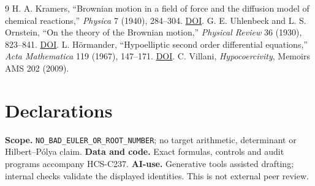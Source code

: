 \documentclass[10pt]{article}
\begin{document}
\begin{thebibliography}{9}
 H. A. Kramers, ``Brownian motion in a field of force and
the diffusion model of chemical reactions,'' \emph{Physica} 7 (1940),
284--304. \href{https://doi.org/10.1016/S0031-8914(40)90098-2}{DOI}.
 G. E. Uhlenbeck and L. S. Ornstein, ``On the theory of the
Brownian motion,'' \emph{Physical Review} 36 (1930), 823--841.
\href{https://doi.org/10.1103/PhysRev.36.823}{DOI}.
 L. Hörmander, ``Hypoelliptic second order differential
equations,'' \emph{Acta Mathematica} 119 (1967), 147--171.
\href{https://doi.org/10.1007/BF02392081}{DOI}.
 C. Villani, \emph{Hypocoercivity}, Memoirs AMS 202 (2009).
\end{thebibliography}

\section*{Declarations}
\textbf{Scope.} \nolinkurl{NO_BAD_EULER_OR_ROOT_NUMBER}; no target arithmetic,
determinant or Hilbert--P\'olya claim.  \textbf{Data and code.} Exact
formulas, controls and audit programs accompany HCS-C237.  \textbf{AI-use.}
Generative tools assisted drafting; internal checks validate the displayed
identities.  This is not external peer review.
\end{document}

